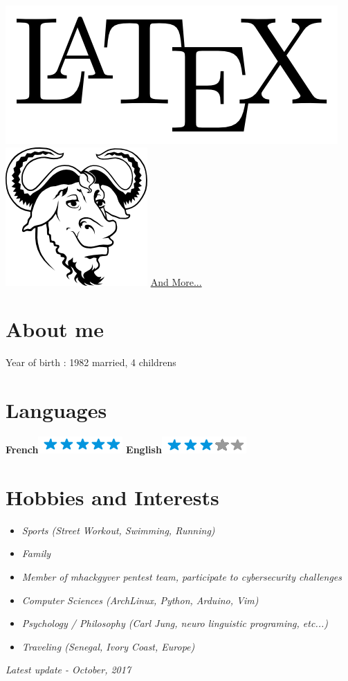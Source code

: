 \documentclass[]{friggeri-cv}
\begin{document}
\begin{aside}
    \includegraphics[scale=0.06]{img/latex.png}
    \includegraphics[scale=0.08]{img/gnu.png}
    \href{http://www.herve-beraud.ovh/skills/}{And More...}
    ~
  \section{About me}
    Year of birth : 1982
    married, 4 childrens 
    ~
  \section{Languages}
    \textbf{French}\includegraphics[scale=0.40]{img/5stars.png}
    \textbf{English}\includegraphics[scale=0.40]{img/3stars.png}
\end{aside}

\section{Hobbies and Interests}
\begin {itemize}
    \item \emph {Sports (Street Workout, Swimming, Running)}
    \item \emph {Family}
    \item \emph {Member of mhackgyver pentest team, participate to cybersecurity challenges}
    \item \emph {Computer Sciences (ArchLinux, Python, Arduino, Vim)}
    \item \emph {Psychology / Philosophy (Carl Jung, neuro linguistic programing, etc...)}
    \item \emph {Traveling (Senegal, Ivory Coast, Europe)}
\end {itemize}

\begin{flushright}
\emph{Latest update - October, 2017}
\end{flushright}
\end{document}
